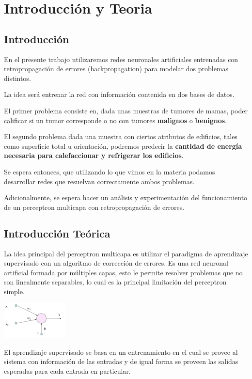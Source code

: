 \section{Introducción y Teoria}
\subsection{Introducción}
En el presente trabajo utilizaremos redes neuronales artificiales entrenadas con retropropagación de errores (backpropagation) para modelar dos problemas distintos. 

La idea será entrenar la red con información contenida en dos bases de datos.

El primer problema consiste en, dada unas muestras de tumores de mamas, poder calificar si un tumor corresponde o no con tumores \textbf{malignos} o \textbf{benignos}.

El segundo problema dada una muestra con ciertos atributos de edificios, tales como superficie total u orientación, podremos predecir la \textbf{cantidad de energía necesaria para calefaccionar y refrigerar los edificios}.

Se espera entonces, que utilizando lo que vimos en la materia podamos desarrollar redes que resuelvan correctamente ambos problemas. 

Adicionalmente, se espera hacer un análisis y experimentación del funcionamiento de un perceptron multicapa con retropropagación de errores.

\subsection{Introducción Teórica}
La idea principal del perceptron multicapa es utilizar el paradigma de aprendizaje supervisado con un algoritmo de corrección de errores. Es una red neuronal artificial formada por múltiples capas, esto le permite resolver problemas que no son linealmente separables, lo cual es la principal limitación del perceptron simple.

\begin{center}
\includegraphics[width=0.25\textwidth]{img/psimple}
\end{center}

El aprendizaje supervisado se basa en un entrenamiento en el cual se provee al sistema con información de las entradas y de igual forma se proveen las salidas esperadas para cada entrada en particular.

